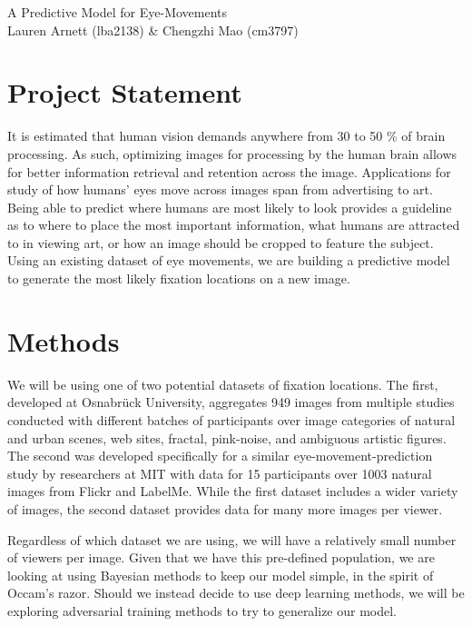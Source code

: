 \documentclass[11pt]{article}
\begin{document}
\begin{center}
    \LARGE {A Predictive Model for Eye-Movements}
    \\\large Lauren Arnett (lba2138) \& Chengzhi Mao (cm3797)
    
\end{center}
\section{Project Statement} 
\vspace{-0.25cm}
It is estimated that human vision demands anywhere from 30 to 50 \% of brain
processing. As such, optimizing images for processing by the human brain allows
for better information retrieval and retention across the image. Applications
for study of how humans' eyes move across images span from advertising to art.
Being able to predict where humans are most likely to look provides a guideline
as to where to place the most important information, what humans are attracted
to in viewing art, or how an image should be cropped to feature the subject.
Using an existing dataset of eye movements, we are building a predictive model
to generate the most likely fixation locations on a new image. 
\vspace{-0.5cm}

\section{Methods} 

\vspace{-0.25cm}
We will be using one of two potential datasets of fixation locations. The
first, developed at Osnabr{\"u}ck University, aggregates 949 images
from multiple studies conducted with different batches of participants over
image categories of natural and urban scenes, web sites, fractal, pink-noise,
and ambiguous artistic figures.  The second was developed specifically for
a similar eye-movement-prediction study by researchers at MIT with data for 15
participants over 1003 natural images from Flickr and LabelMe. While the first
dataset includes a wider variety of images, the second dataset provides data
for many more images per viewer.

Regardless of which dataset we are using, we will have a relatively small
number of viewers per image. Given that we have this pre-defined population, we
are looking at using Bayesian methods to keep our model simple, in the spirit
of Occam's razor. Should we instead decide to use deep learning methods, we
will be exploring adversarial training methods to try to generalize our model.
\end{document}
